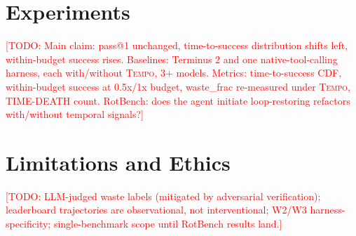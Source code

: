 \documentclass[10pt]{article}
\newcommand{\todo}[1]{\textcolor{red}{[TODO: #1]}}
\newcommand{\tempo}{\textsc{Tempo}}
\begin{document}
\section{Experiments}
\label{sec:experiments}

\todo{Main claim: pass@1 unchanged, time-to-success distribution shifts left,
within-budget success rises. Baselines: Terminus 2 and one native-tool-calling
harness, each with/without \tempo{}, 3+ models. Metrics: time-to-success CDF,
within-budget success at 0.5x/1x budget, waste\_frac re-measured under \tempo{},
TIME-DEATH count. RotBench: does the agent initiate loop-restoring refactors
with/without temporal signals?}

\section{Limitations and Ethics}
\todo{LLM-judged waste labels (mitigated by adversarial verification);
leaderboard trajectories are observational, not interventional; W2/W3
harness-specificity; single-benchmark scope until RotBench results land.}



\end{document}
